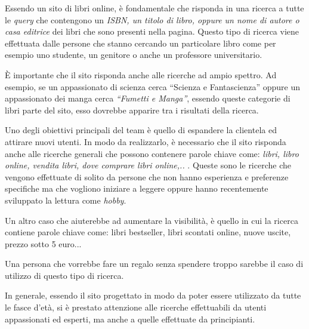 Essendo un sito di libri online, è fondamentale che risponda in una ricerca a tutte le \textit{query} che contengono un \textit{ISBN, un titolo di libro, oppure un nome di autore o casa editrice} dei libri che sono presenti nella pagina. Questo tipo di ricerca viene effettuata dalle persone che stanno cercando un particolare libro come per esempio uno studente, un genitore o anche un professore universitario.

È importante che il sito risponda anche alle ricerche ad ampio spettro. Ad esempio, se un appassionato di scienza cerca “Scienza e Fantascienza” oppure un appassionato dei manga cerca \textit{“Fumetti e Manga”}, essendo queste categorie di libri parte del sito, esso dovrebbe apparire tra i risultati della ricerca.

Uno degli obiettivi principali del team è quello di espandere la clientela ed attirare nuovi utenti. In modo da realizzarlo, è necessario che il sito risponda anche alle ricerche generali che possono contenere parole chiave come: \textit{libri, libro online, vendita libri, dove comprare libri online,..} . Queste sono le ricerche che vengono effettuate di solito da persone che non hanno esperienza e preferenze specifiche ma che vogliono iniziare a leggere oppure hanno recentemente sviluppato la lettura come \textit{hobby}.

Un altro caso che aiuterebbe ad aumentare la visibilità, è quello in cui la ricerca contiene parole chiave come: libri bestseller, libri scontati online, nuove uscite, prezzo sotto 5 euro...

Una persona che vorrebbe fare un regalo senza spendere troppo sarebbe il caso di utilizzo di questo tipo di ricerca.

In generale, essendo il sito progettato in modo da poter essere utilizzato da tutte le fasce d'età, si è prestato attenzione alle ricerche effettuabili da utenti appassionati ed esperti, ma anche a quelle effettuate da principianti.

